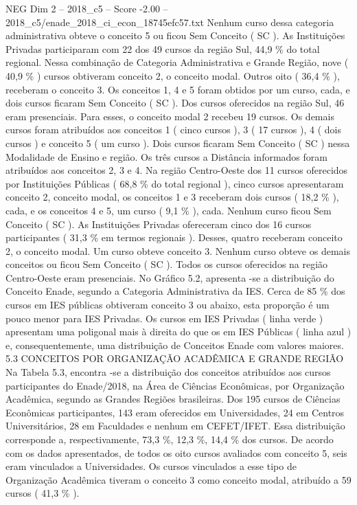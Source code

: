 \begin{textsample}{NEG Dim 2 – 2018\_c5 – Score -2.00 – 2018\_c5/enade\_2018\_ci\_econ\_18745efc57.txt}
Nenhum curso dessa categoria administrativa obteve o conceito 5 ou ficou Sem Conceito ( SC ).
As Instituições Privadas participaram com 22 dos 49 cursos da região Sul, 44,9 \% do total regional.
Nessa combinação de Categoria Administrativa e Grande Região, nove ( 40,9 \% ) cursos obtiveram conceito 2, o conceito modal.
Outros oito ( 36,4 \% ), receberam o conceito 3.
Os conceitos 1, 4 e 5 foram obtidos por um curso, cada, e dois cursos ficaram Sem Conceito ( SC ).
Dos cursos oferecidos na região Sul, 46 eram presenciais.
Para esses, o conceito modal 2 recebeu 19 cursos.
Os demais cursos foram atribuídos aos conceitos 1 ( cinco cursos ), 3 ( 17 cursos ), 4 ( dois cursos ) e conceito 5 ( um curso ).
Dois cursos ficaram Sem Conceito ( SC ) nessa Modalidade de Ensino e região.
Os três cursos a Distância informados foram atribuídos aos conceitos 2, 3 e 4.
Na região Centro-Oeste dos 11 cursos oferecidos por Instituições Públicas ( 68,8 \% do total regional ), cinco cursos apresentaram conceito 2, conceito modal, os conceitos 1 e 3 receberam dois cursos ( 18,2 \% ), cada, e os conceitos 4 e 5, um curso ( 9,1 \% ), cada.
Nenhum curso ficou Sem Conceito ( SC ).
As Instituições Privadas ofereceram cinco dos 16 cursos participantes ( 31,3 \% em termos regionais ).
Desses, quatro receberam conceito 2, o conceito modal.
Um curso obteve conceito 3.
Nenhum curso obteve os demais conceitos ou ficou Sem Conceito ( SC ).
Todos os cursos oferecidos na região Centro-Oeste eram presenciais.
No Gráfico 5.2, apresenta -se a distribuição do Conceito Enade, segundo a Categoria Administrativa da IES.
Cerca de 85 \% dos cursos em IES públicas obtiveram conceito 3 ou abaixo, esta proporção é um pouco menor para IES Privadas.
Os cursos em IES Privadas ( linha verde ) apresentam uma poligonal mais à direita do que os em IES Públicas ( linha azul ) e, consequentemente, uma distribuição de Conceitos Enade com valores maiores. 5.3 CONCEITOS POR ORGANIZAÇÃO ACADÊMICA E GRANDE REGIÃO Na Tabela 5.3, encontra -se a distribuição dos conceitos atribuídos aos cursos participantes do Enade/2018, na Área de Ciências Econômicas, por Organização Acadêmica, segundo as Grandes Regiões brasileiras.
Dos 195 cursos de Ciências Econômicas participantes, 143 eram oferecidos em Universidades, 24 em Centros Universitários, 28 em Faculdades e nenhum em CEFET/IFET.
Essa distribuição corresponde a, respectivamente, 73,3 \%, 12,3 \%, 14,4 \% dos cursos.
De acordo com os dados apresentados, de todos os oito cursos avaliados com conceito 5, seis eram vinculados a Universidades.
Os cursos vinculados a esse tipo de Organização Acadêmica tiveram o conceito 3 como conceito modal, atribuído a 59 cursos ( 41,3 \% ).

\end{textsample}
